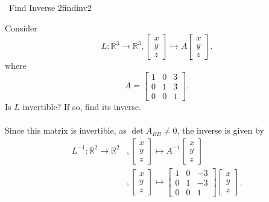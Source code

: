         \begin{example}{\Difficulty\,\Difficulty\,\,Find Inverse 2}{findinv2}

            Consider
            \begin{equation*}
                L:\mathbb{R}^3\to\mathbb{R}^3,\begin{bmatrix} x \\ y \\ z \end{bmatrix}\mapsto A\begin{bmatrix} x \\ y \\ z \end{bmatrix}.
            \end{equation*}
            where
            \begin{equation*}
                A=\begin{bmatrix}
                    1 & 0 & 3 \\
                    0 & 1 & 3 \\
                    0 & 0 & 1
                \end{bmatrix}.
            \end{equation*}
            Is \(L\) invertible? If so, find its inverse.
            \\
            \\
            Since this matrix is invertible, as \(\det A_{BB}\neq 0\), the inverse is given by
            \begin{align*}
                L^{-1}:\mathbb{R}^2\to\mathbb{R}^2&,\begin{bmatrix} x \\ y \\ z \end{bmatrix}\mapsto A^{-1}\begin{bmatrix} x \\ y  \\ z \end{bmatrix} \\
                &,\begin{bmatrix} x \\ y \\ z \end{bmatrix}\mapsto \begin{bmatrix} 1 & 0 & -3 \\ 0 & 1 & -3 \\ 0 & 0 & 1 \end{bmatrix}\begin{bmatrix} x \\ y \\ z \end{bmatrix}.
            \end{align*}
        \end{example}
